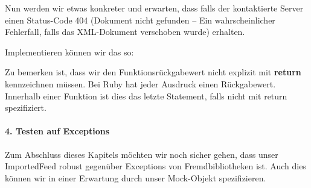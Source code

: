 \tddgreen
Nun werden wir etwas konkreter und erwarten, dass falls der kontaktierte Server einen Status-Code 404 (Dokument nicht gefunden -- Ein wahrscheinlicher Fehlerfall, falls das XML-Dokument verschoben wurde) erhalten.
\begin{ruby}[label=test/test\_imported\_job.rb]
  
     
    
   
\end{ruby}

\tddred

Implementieren können wir das so:

\begin{ruby}[label=ib/imported\_job.rb]
 
    
   
      
      
      

   
      
\end{ruby}


\tddgreen
Zu bemerken ist, dass wir den Funktionsrückgabewert nicht explizit mit \textbf{return} kennzeichnen müssen. Bei Ruby hat jeder Ausdruck einen Rückgabewert. Innerhalb einer Funktion ist dies das letzte Statement, falls nicht mit return spezifiziert.

\paragraph{4. Testen auf Exceptions}

Zum Abschluss dieses Kapitels möchten wir noch sicher gehen, dass unser ImportedFeed robust gegenüber Exceptions von Fremdbibliotheken ist. Auch dies können wir in einer Erwartung durch unser Mock-Objekt spezifizieren.

